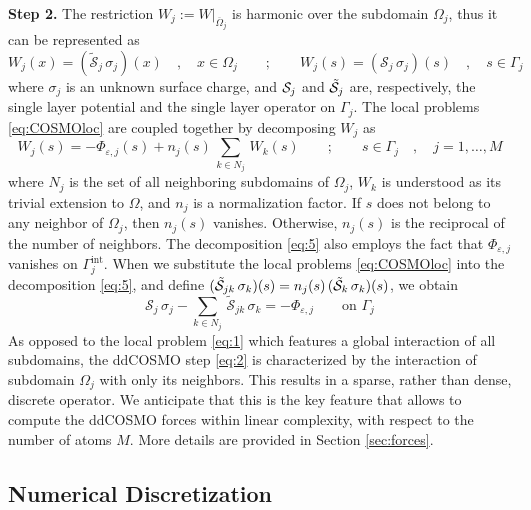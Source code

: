 {\bf Step 2.} The restriction $W_j := W |_{\overline{\Omega}_j}$ is harmonic over the subdomain $\Omega_j$, thus it can be represented as 
\begin{equation}\label{eq:COSMOloc}
W_j(x) = (\tilde{\mathcal{S}}_j \,  \sigma_j) (x) \quad , \quad x \in \Omega_j \qquad ; \qquad
W_j(s) = (\mathcal{S}_j \,  \sigma_j) (s) \quad , \quad s \in \Gamma_j
\end{equation}
where $\sigma_j$ is an unknown surface charge, and $\mathcal{S}_j$ and $\tilde{\mathcal{S}}_j$ are, respectively, the single layer potential and the single layer operator on $\Gamma_j$. The local problems \eqref{eq:COSMOloc} are coupled together by decomposing $W_j$ as
\begin{equation}\label{eq:5}
W_j(s) = - \Phi_{\varepsilon,j}(s) +  n_j(s) \, \sum_{k \in N_j} \,{W}_k(s) \qquad ; \qquad s \in \Gamma_j \quad , \quad j = 1, \ldots , M
\end{equation}
where $N_j$ is the set of all neighboring subdomains of $\Omega_j$, $W_k$ is understood as its trivial extension to $\Omega$, and $n_j$ is a normalization factor. If $s$ does not belong to any neighbor of $\Omega_j$, then $n_j(s)$ vanishes. Otherwise, $n_j(s)$ is the reciprocal of the number of neighbors. The decomposition \eqref{eq:5} also employs the fact that $\Phi_{\varepsilon,j}$ vanishes on $\Gamma_j^\text{int}$. When we substitute the local problems \eqref{eq:COSMOloc} into the decomposition \eqref{eq:5}, and define $(\tilde{\mathcal{S}}_{jk} \, \sigma_k) (s) = n_j(s) \, (\tilde{\mathcal{S}}_k \, \sigma_k)(s)$, we obtain
\begin{equation}\label{eq:2}
\mathcal{S}_j \, \sigma_j  -  \sum_{k \in N_j} \, \tilde{\mathcal{S}}_{jk} \, \sigma_k = -  \Phi_{\varepsilon,j} \qquad \text{on } \Gamma_j
\end{equation}
As opposed to the local problem \eqref{eq:1} which features a global interaction of all subdomains, the ddCOSMO step \eqref{eq:2} is characterized by the interaction of subdomain $\Omega_j$ with only its neighbors. This results in a sparse, rather than dense, discrete operator. We anticipate that this is the key feature that allows to compute the ddCOSMO forces within linear complexity, with respect to the number of atoms $M$. More details are provided in Section \ref{sec:forces}.

\subsection{Numerical Discretization}

